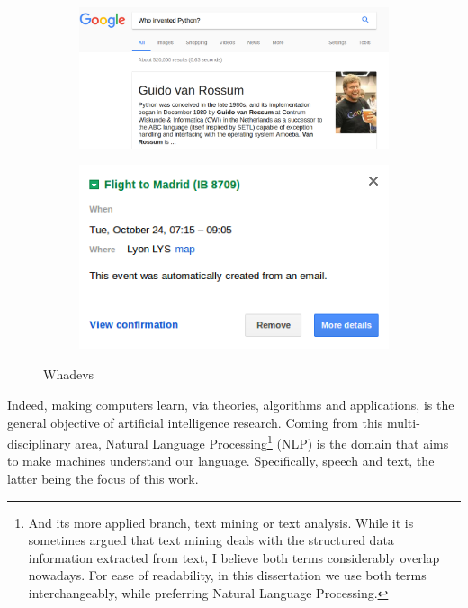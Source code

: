 \begin{figure}
\centering
	\begin{subfigure}[b]{0.55\textwidth}
	\includegraphics[width=1\linewidth]{./images/Chapitre1/guido_google.png}
	\caption{}
	\label{fig:guido_gmail}
\end{subfigure}

	\begin{subfigure}[b]{0.55\textwidth}
	\includegraphics[width=1\linewidth]{./images/Chapitre1/calendar2.png}
	\caption{}
	\label{fig:guido_gmail}
\end{subfigure}
\caption[foo]{Whadevs}	
\end{figure}
%
Indeed, making computers learn,  via theories, algorithms and applications, is the general objective of artificial intelligence research. Coming from this multi-disciplinary area, Natural Language Processing\footnote{And its more applied branch, text mining or text analysis. While it is sometimes argued that text mining deals with the structured data information extracted from text, I believe both terms considerably overlap nowadays. For ease of readability, in this dissertation we use both terms interchangeably, while preferring Natural Language Processing.} (NLP) is the domain that aims to make machines understand our language. Specifically, speech and text, the latter being the focus of this work.

